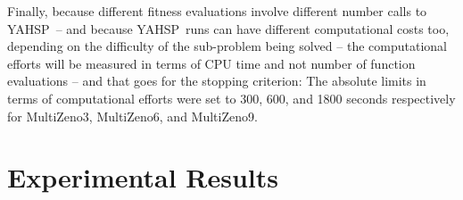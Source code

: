 \documentclass{llncs}
\def\YAHSP{{\sc YAHSP}}
\def\MULTIZENO{{\sc MultiZeno}}
\def\PARAMILS{{\sc ParamILS}}
\begin{document}
Finally, because different fitness evaluations involve different number calls to \YAHSP\ -- and because \YAHSP\ runs can have different computational costs too, depending on the difficulty of the sub-problem being solved -- the computational efforts will be measured in terms of CPU time and not number of function evaluations -- and that goes for the stopping criterion: The absolute limits in terms of computational efforts were set to 300, 600, and 1800 seconds respectively for  \MULTIZENO3,  \MULTIZENO6, and  \MULTIZENO9.



\section{Experimental Results}
\label{sec:experiments}

\end{document}
